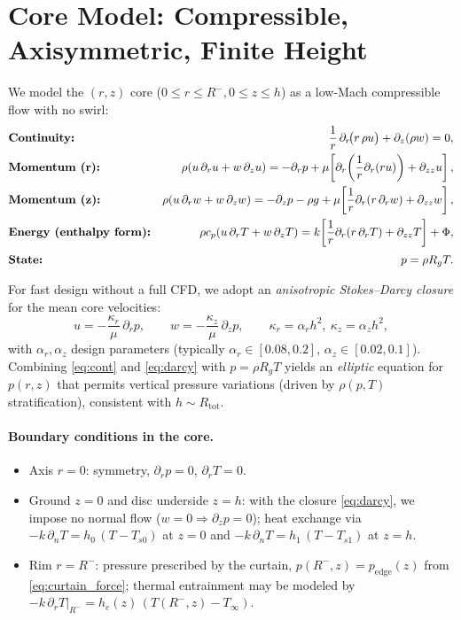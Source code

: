 \documentclass[11pt,a4paper]{article}
\begin{document}
\section{Core Model: Compressible, Axisymmetric, Finite Height}
We model the $(r,z)$ core ($0\le r\le R^-, 0\le z\le h$) as a low-Mach compressible flow with no swirl:
\begin{align}
  &\text{\bf Continuity:} &
  \frac{1}{r}\,\partial_r\!\big(r\,\rho u\big)+\partial_z(\rho w)=0,
  \label{eq:cont}\\
  &\text{\bf Momentum (r):} &
  \rho\!\left(u\,\partial_r u+w\,\partial_z u\right)
  = -\partial_r p+\mu\!\left[\partial_r\!\left(\frac{1}{r}\partial_r(ru)\right)+\partial_{zz}u\right],
  \label{eq:momr}\\
  &\text{\bf Momentum (z):} &
  \rho\!\left(u\,\partial_r w+w\,\partial_z w\right)
  = -\partial_z p - \rho g + \mu\!\left[\frac{1}{r}\partial_r\!\left(r\,\partial_r w\right)+\partial_{zz}w\right],
  \label{eq:momz}\\
  &\text{\bf Energy (enthalpy form):} &
  \rho c_p\!\left(u\,\partial_r T+w\,\partial_z T\right)
  = k\!\left[\frac{1}{r}\partial_r\!\left(r\,\partial_r T\right)+\partial_{zz}T\right]+\Phi,
  \label{eq:energy}\\[2pt]
  &\text{\bf State:} &
  p=\rho R_g T.
  \label{eq:state}
\end{align}

For fast design without a full CFD, we adopt an \emph{anisotropic Stokes--Darcy closure} for the mean core velocities:
\begin{equation}
  u = -\frac{\kappa_r}{\mu}\,\partial_r p,\qquad
  w = -\frac{\kappa_z}{\mu}\,\partial_z p,
  \qquad \kappa_r=\alpha_r h^2,\ \kappa_z=\alpha_z h^2,
  \label{eq:darcy}
\end{equation}
with $\alpha_r,\alpha_z$ design parameters (typically $\alpha_r\!\in[0.08,0.2]$, $\alpha_z\!\in[0.02,0.1]$). Combining \eqref{eq:cont} and \eqref{eq:darcy} with $p=\rho R_g T$ yields an \emph{elliptic} equation for $p(r,z)$ that permits vertical pressure variations (driven by $\rho(p,T)$ stratification), consistent with $h\sim R_{\text{tot}}$.

\paragraph{Boundary conditions in the core.}
\begin{itemize}
  \item Axis $r=0$: symmetry, $\partial_r p=0$, $\partial_r T=0$.
  \item Ground $z=0$ and disc underside $z=h$: with the closure \eqref{eq:darcy}, we impose no normal flow ($w=0\Rightarrow \partial_z p=0$); heat exchange via
  $-k\,\partial_n T=h_0\,(T-T_{s0})$ at $z=0$ and $-k\,\partial_n T=h_1\,(T-T_{s1})$ at $z=h$.
  \item Rim $r=R^-$: pressure prescribed by the curtain, $p(R^-,z)=p_\mathrm{edge}(z)$ from \eqref{eq:curtain_force};
  thermal entrainment may be modeled by $-k\,\partial_r T\big|_{R^-}=h_e(z)\,(T(R^-,z)-T_\infty)$.
\end{itemize}
\end{document}
